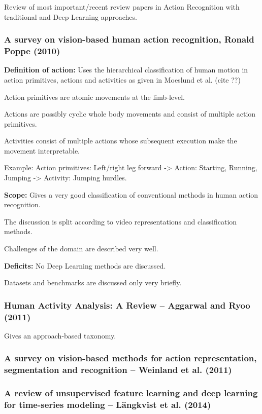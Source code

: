Review of most important/recent review papers in Action Recognition with traditional and Deep Learning approaches.

\subsubsection{A survey on vision-based human action recognition, Ronald Poppe (2010)}

\textbf{Definition of action:} Uses the hierarchical classification of human motion in action primitives, actions and activities as given in Moeslund et al. (cite ??)

Action primitives are atomic movements at the limb-level.

Actions are possibly cyclic whole body movements and consist of multiple action primitives.

Activities consist of multiple actions whose subsequent execution make the movement interpretable.

Example: Action primitives: Left/right leg forward -> Action: Starting, Running, Jumping -> Activity: Jumping hurdles.

\textbf{Scope:} Gives a very good classification of conventional methods in human action recognition.

The discussion is split according to video representations and classification methods.

Challenges of the domain are described very well.

\textbf{Deficits:} No Deep Learning methods are discussed. 

Datasets and benchmarks are discussed only very briefly.

\subsubsection{Human Activity Analysis: A Review -- Aggarwal and Ryoo (2011)}

Gives an approach-based taxonomy.

\subsubsection{A survey on vision-based methods for action representation, segmentation and recognition -- Weinland et al. (2011)}

\subsubsection{A review of unsupervised feature learning and deep learning for time-series modeling -- Längkvist et al. (2014)}

